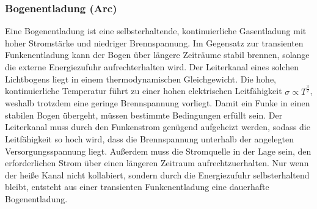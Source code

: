\subsubsection{Bogenentladung (Arc)}
Eine Bogenentladung ist eine selbsterhaltende, kontinuierliche Gasentladung mit hoher Stromstärke und niedriger Brennspannung. Im Gegensatz zur transienten Funkenentladung kann der Bogen über längere Zeiträume stabil brennen, solange die externe Energiezufuhr aufrechterhalten wird. Der Leiterkanal eines solchen Lichtbogens liegt in einem thermodynamischen Gleichgewicht. Die hohe, kontinuierliche Temperatur führt zu einer hohen elektrischen Leitfähigkeit \(\sigma \propto T^{\frac{3}{2}}\), weshalb trotzdem eine geringe Brennspannung vorliegt. 
Damit ein Funke in einen stabilen Bogen übergeht, müssen bestimmte Bedingungen erfüllt sein. Der Leiterkanal muss durch den Funkenstrom genügend aufgeheizt werden, sodass die Leitfähigkeit so hoch wird, dass die Brennspannung unterhalb der angelegten Versorgungsspannung liegt. Außerdem muss die Stromquelle in der Lage sein, den erforderlichen Strom über einen längeren Zeitraum aufrechtzuerhalten. Nur wenn der heiße Kanal nicht kollabiert, sondern durch die Energiezufuhr selbsterhaltend bleibt, entsteht aus einer transienten Funkenentladung eine dauerhafte Bogenentladung.


